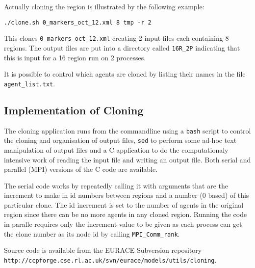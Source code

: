 Actually cloning the region is illustrated by the following example:

\begin{verbatim}
./clone.sh 0_markers_oct_12.xml 8 tmp -r 2
\end{verbatim}

This clones \texttt{0\_markers\_oct\_12.xml} creating 2 input files each containing 8 regions. The output files are put into a directory called \texttt{16R\_2P} indicating that this is input for a 16 region run on 2 processes.

It is possible to control which agents are cloned by listing their names in the file \texttt{agent\_list.txt}.

\subsection{Implementation of Cloning}

The cloning application runs from the commandline using a \texttt{bash} script to control the cloning and organisation of output files, \texttt{sed} to perform some ad-hoc text manipulation of output files and a C application to do the computationaly intensive work of reading the input file and writing an output file. Both serial and parallel (MPI) versions of the C code are available.

The serial code works by repeatedly calling it with arguments that are the increment to make in id numbers between regions and a number (0 based) of this particular clone. The id increment is set to the number of agents in the original region since there can be no more agents in any cloned region. Running the code in paralle requires only the increment value to be given as each process can get the clone number as its node id by calling \texttt{MPI\_Comm\_rank}.

{\raggedright Source code is available from the EURACE Subversion repository \break \verb+http://ccpforge.cse.rl.ac.uk/svn/eurace/models/utils/cloning+.}
